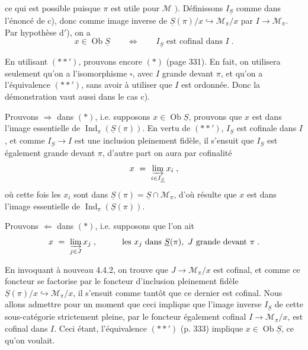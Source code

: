 \documentclass[11pt]{article}
\newcommand{\printedpage}[1]{\marginpar{\footnotesize p.~#1}}
\newcommand{\msp}[1]{\marginpar{\footnotesize [#1]}}
\newcommand{\Ob}{\operatorname{Ob}}
\DeclareMathOperator{\Ind}{Ind}
\begin{document}
ce qui est possible puisque $\pi$ est utile pour $\mathcal{M}$ $\Bigg)$. Définissons $I_{\underline{S}}$ comme dans l'énoncé de c), donc comme image inverse de $\underline{S}(\pi)/x \hookrightarrow \mathcal{M}_\pi/x$ par $I \longrightarrow \mathcal{M}_\pi$. Par hypothèse d$'$), on a
\[
x \in \Ob\underline{S} \qquad \Longleftrightarrow \qquad I_{\underline{S}} \text{ est cofinal dans } I \; . \tag*{$(**')$}
\]

En utilisant $(**')$, prouvons encore $(*)$ (page 331). En fait, on utilisera seulement qu'on a
\msp{page 334}
l'isomorphisme $\square$, avec $I$ grande devant $\pi$, et qu'on a l'équivalence $(**')$, sans avoir à utiliser que $I$ est ordonnée. Donc la démonstration vaut aussi dans le cas c).

Prouvons $\Longrightarrow$ dans $(*)$, i.e. supposons $x \in \Ob\underline{S}$, prouvons que $x$ est dans l'image essentielle de $\Ind_\pi(\underline{S}(\pi))$. En vertu de $(**')$, $I_{\underline{S}}$ est cofinale dans $I$, et comme $I_{\underline{S}} \longrightarrow I$ est une inclusion pleinement fidèle, il s'ensuit que $I_{\underline{S}}$ est également grande devant $\pi$, d'autre part on aura par cofinalité
\[
x \ = \ \varinjlim_{i\in I_{\underline{S}}} x_i \; ,
\]
où cette fois les $x_i$ sont dans $\underline{S}(\pi) = \underline{S}\cap\mathcal{M}_\pi$, d'où résulte que $x$ est dans l'image essentielle de $\Ind_\pi(\underline{S}(\pi))$.

Prouvons $\Longleftarrow$ dans $(*)$, i.e. supposons que l'on ait
\[
x \ = \ \varinjlim_{j\in J} x_j \; , \qquad\quad \text{les } x_j \text{ dans } \underline{S}(\pi),\ J \text{ grande devant } \pi \; .
\]

\printedpage{127}

\msp{page 335}

En invoquant à nouveau 4.4.2, on trouve que $J \longrightarrow \mathcal{M}_\pi/x$ est cofinal, et comme ce foncteur se factorise par le foncteur d'inclusion pleinement fidèle $\underline{S}(\pi)/x \hookrightarrow \mathcal{M}_\pi/x$, il s'ensuit comme tantôt que ce dernier est cofinal. Nous allons admettre pour un moment que ceci implique que l'image inverse $I_{\underline{S}}$ de cette sous-catégorie strictement pleine, par le foncteur également cofinal $I \longrightarrow \mathcal{M}_\pi/x$, est cofinal dans $I$. Ceci étant, l'équivalence $(**')$ (p. 333) implique $x \in \Ob\underline{S}$, ce qu'on voulait.
\end{document}
